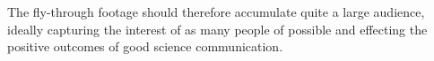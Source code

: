 \documentclass[pra, reprint, A4 paper, bibnotes]{revtex4-1}
\begin{document}
The fly-through footage should therefore accumulate quite a large audience, ideally capturing the interest of as many people of possible and effecting the positive outcomes of good science communication. 


\end{document}

